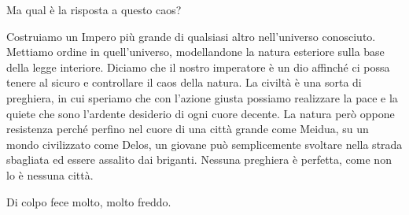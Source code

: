 Ma qual è la risposta a questo caos?

Costruiamo un Impero più grande di qualsiasi altro nell'universo
conosciuto. Mettiamo ordine in quell'universo, modellandone la natura
esteriore sulla base della legge interiore. Diciamo che il nostro
imperatore è un dio affinché ci possa tenere al sicuro e controllare il
caos della natura. La civiltà è una sorta di preghiera, in cui speriamo
che con l'azione giusta possiamo realizzare la pace e la quiete che sono
l'ardente desiderio di ogni cuore decente. La natura però oppone
resistenza perché perfino nel cuore di una città grande come Meidua, su
un mondo civilizzato come Delos, un giovane può semplicemente svoltare
nella strada sbagliata ed essere assalito dai briganti. Nessuna
preghiera è perfetta, come non lo è nessuna città.

Di colpo fece molto, molto freddo.

